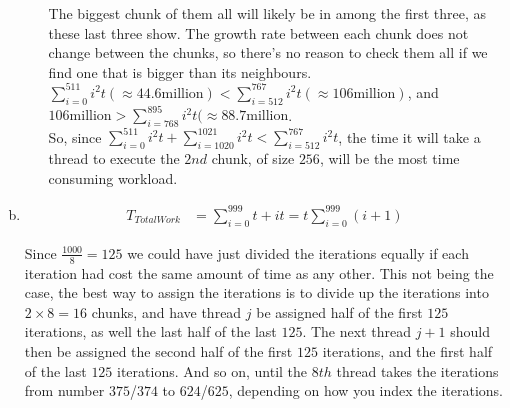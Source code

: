 \documentclass[fontsize=11pt, paper=a4, titlepage]{article}
\begin{document}
\begin{enumerate}[a)]
\begin{enumerate}[I)]
The biggest chunk of them all will likely be in among the first three, as these
last three show. The growth rate between each chunk does not change between the
chunks, so there's no reason to check them all if we find one that is bigger
than its neighbours. \\

$\sum_{i=0}^{511}i^2t (\approx 44.6 \textrm{million}) < \sum_{i=512}^{767}i^2t
(\approx 106 \textrm{million})$, and $106 \textrm{million} > \sum_{i=768}^{895}i
^2t (\approx 88.7 \textrm{million}$. \\

So, since $\sum_{i=0}^{511} i^2t + \sum_{i=1020}^{1021} i^2t <
\sum_{i=512}^{767} i^2t$, the time it will take a thread to execute the $2nd$
chunk, of size $256$, will be the most time consuming workload.

    \end{enumerate}

    \item \begin{align*}
        T_{TotalWork} &= \sum_{i=0}^{999} t+it = t\sum_{i=0}^{999} (i+1)
    \end{align*}

Since $\frac{1000}{8} = 125$ we could have just divided the iterations equally
if each iteration had cost the same amount of time as any other. This not being
the case, the best way to assign the iterations is to divide up the iterations
into $2\times 8 = 16$ chunks, and have thread $j$ be assigned half of the first
$125$ iterations, as well the last half of the last $125$. The next thread $j+1$
should then be assigned the second half of the first $125$ iterations, and the
first half of the last $125$ iterations. And so on, until the $8th$ thread takes
the iterations from number $375$/$374$ to $624$/$625$, depending on how you index the iterations.

\end{enumerate}
\end{document}
